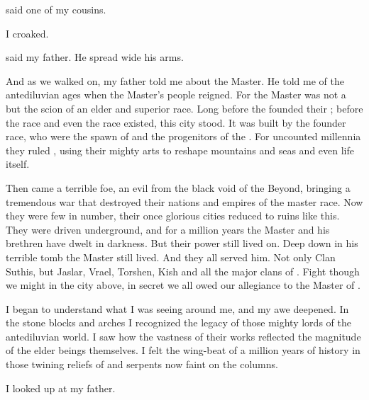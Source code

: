 \documentclass
  [a4paper,
   12pt,
   oneside
  ]%
  {article}
\begin{document}
 said one of my cousins.

 I croaked. 

 said my father. 
He spread wide his arms.




And as we walked on, my father told me about the Master. 
He told me of the antediluvian ages when the Master's people reigned.
For the Master was not a \scatha but the scion of an elder and superior race. 
Long before the \humans founded their \VaimonCaliphate; before the \human race and even the \scatha race existed, this city stood. 
It was built by the founder race, who were the spawn of \dragons and the progenitors of the \scathae. 
For uncounted millennia they ruled \Miith, using their mighty arts to reshape mountains and seas and even life itself. 

Then came a terrible foe, an evil from the black void of the Beyond, bringing a tremendous war that destroyed their nations and empires of the master race.
Now they were few in number, their once glorious cities reduced to ruins like this.
They were driven underground, and for a million years the Master and his brethren have dwelt in darkness. 
But their power still lived on. 
Deep down in his terrible tomb the Master still lived.
And they all served him.
Not only Clan Suthis, but Jaslar, Vrael, Torshen, Kish and all the major clans of \Yormis.
Fight though we might in the city above, in secret we all owed our allegiance to the Master of \Yormis. 

I began to understand what I was seeing around me, and my awe deepened. 
In the stone blocks and arches I recognized the legacy of those mighty lords of the antediluvian world. 
I saw how the vastness of their works reflected the magnitude of the elder beings themselves. 
I felt the wing-beat of a million years of history in those twining reliefs of \dragons and serpents now faint on the columns. 

I looked up at my father.
\end{document}
